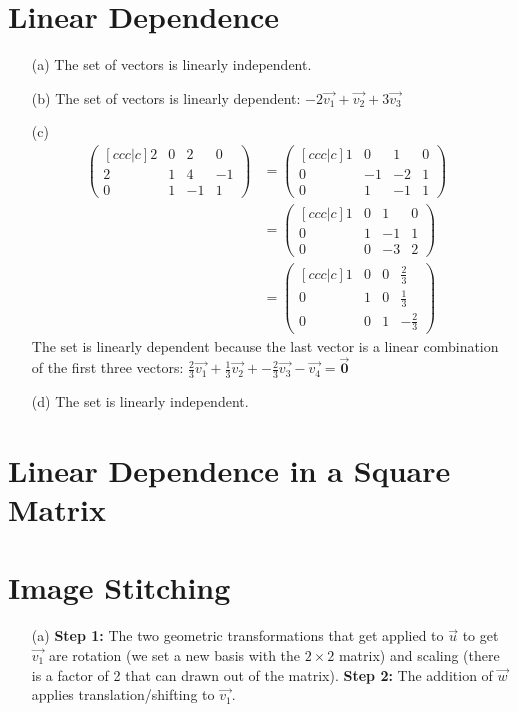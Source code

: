 \documentclass[10pt,a4paper]{article}
\begin{document}
\section{Linear Dependence}
\begin{itemize}
  \item[(a)] The set of vectors is linearly independent.

  \item[(b)] The set of vectors is linearly dependent: $-2\vec{v_1} + \vec{v_2} + 3\vec{v_3}$

  \item[(c)]
  \begin{align*}
    \begin{pmatrix}[ccc|c]
        2 & 0 & 2 & 0 \\
        2 & 1 & 4 & -1 \\
        0 & 1 & -1 & 1
       \end{pmatrix}
    &= \begin{pmatrix}[ccc|c]
        1 & 0 & 1 & 0 \\
        0 & -1 & -2 & 1 \\
        0 & 1 & -1 & 1
       \end{pmatrix} & \\
    &= \begin{pmatrix}[ccc|c]
        1 & 0 & 1 & 0 \\
        0 & 1 & -1 & 1 \\
        0 & 0 & -3 & 2
       \end{pmatrix} & \\
    &= \begin{pmatrix}[ccc|c]
        1 & 0 & 0 & \frac{2}{3} \\
        0 & 1 & 0 & \frac{1}{3} \\
        0 & 0 & 1 & -\frac{2}{3}
       \end{pmatrix}
  \end{align*}
  The set is linearly dependent because the last vector is a linear combination of the first three vectors: $\frac{2}{3}\vec{v_1} + \frac{1}{3}\vec{v_2} +
  -\frac{2}{3}\vec{v_3} - \vec{v_4} = \mathbf{\vec{0}}$

  \item[(d)] The set is linearly independent.
\end{itemize}

\section{Linear Dependence in a Square Matrix}

\section{Image Stitching}
\begin{itemize}
  \item[(a)] \textbf{Step 1:} The two geometric transformations that get applied to $\vec{u}$ to get $\vec{v_1}$ are rotation (we set a new basis with the $2 \times 2$ matrix) and scaling (there is a factor of 2 that can drawn out of the matrix). \textbf{Step 2:} The addition of $\vec{w}$ applies translation/shifting to $\vec{v_1}$.
\end{itemize}
\end{document}
